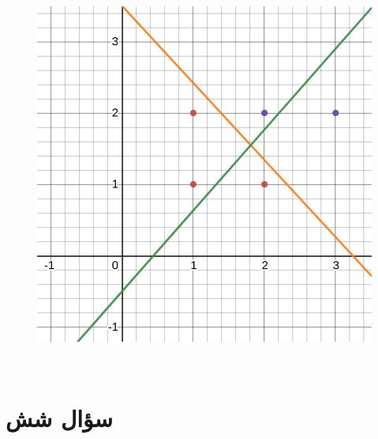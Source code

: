 \documentclass[12pt,onecolumn,a4paper]{article}
\begin{document}
\begin{figure}[h!]
    \begin{center}
    \includegraphics[width=\linewidth]{desmos-graph.png}
    \end{center}
\end{figure}


\newpage
~\newpage
\section*{سؤال شش}
\end{document}
